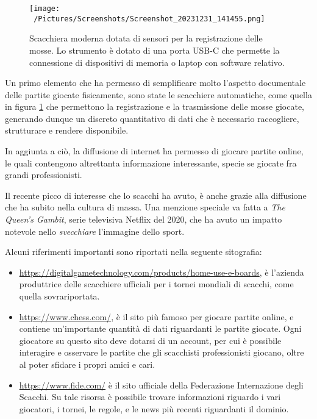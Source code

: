 \documentclass[12pt]{book}
\begin{document}
\begin{figure}[h]
  \caption{Scacchiera moderna dotata di sensori per la registrazione
  delle mosse. Lo strumento è dotato di una porta USB-C che permette
  la connessione di dispositivi di memoria o laptop con software
  relativo.}
  \centering
  \label{fig:scacchiera}
  \texttt{[image: ~/Pictures/Screenshots/Screenshot\_20231231\_141455.png]}
\end{figure} 

Un primo elemento che ha permesso di
semplificare molto l'aspetto documentale
delle partite giocate fisicamente, sono state le scacchiere
automatiche,
come quella in figura \ref{fig:scacchiera} che
permettono la registrazione e la trasmissione delle mosse giocate,
generando dunque un discreto quantitativo di dati che è necessario
raccogliere, strutturare e rendere disponibile.

In aggiunta a ciò, la diffusione di internet ha permesso di giocare
partite
online, le quali contengono altrettanta informazione interessante,
specie se giocate fra grandi professionisti. 

Il recente picco di interesse che lo scacchi ha avuto, è anche grazie alla 
diffusione che ha subito nella cultura di
massa. Una menzione speciale va fatta a \textit{The Queen's Gambit}, 
serie televisiva Netflix del 2020, che ha avuto un impatto notevole nello
\textit{svecchiare} l'immagine dello sport.


Alcuni riferimenti importanti sono riportati nella seguente
sitografia:
\begin{itemize}
  \item \url{https://digitalgametechnology.com/products/home-use-e-boards}, è
    l'azienda produttrice delle scacchiere ufficiali per i tornei
    mondiali di scacchi, come quella sovrariportata.
  \item \url{https://www.chess.com/}, è il sito più famoso per giocare
    partite online, e contiene un'importante quantità di dati
    riguardanti le partite giocate. Ogni giocatore su questo sito deve
    dotarsi di un account, per cui è possibile interagire e osservare
    le partite che gli scacchisti professionisti giocano, oltre al
    poter sfidare i propri amici e cari.
  \item \url{https://www.fide.com/} è il sito ufficiale della Federazione
    Internazione degli Scacchi. Su tale risorsa è possibile trovare
    informazioni riguardo i vari giocatori, i tornei, le regole, e le
    news più recenti riguardanti il dominio.
\end{itemize}
\end{document}
